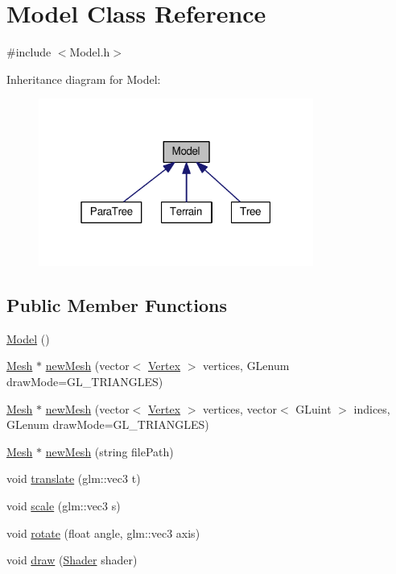 \hypertarget{class_model}{}\section{Model Class Reference}
\label{class_model}


{\ttfamily \#include $<$Model.\+h$>$}



Inheritance diagram for Model\+:\nopagebreak
\begin{figure}[H]
\begin{center}
\leavevmode
\includegraphics[width=256pt]{class_model__inherit__graph}
\end{center}
\end{figure}
\subsection*{Public Member Functions}
\begin{DoxyCompactItemize}
\item 
\hyperlink{class_model_ae3b375de5f6df4faf74a95d64748e048}{Model} ()
\item 
\hyperlink{class_mesh}{Mesh} $\ast$ \hyperlink{class_model_a0389a9deaec401c6050eddecfebd4eff}{new\+Mesh} (vector$<$ \hyperlink{struct_vertex}{Vertex} $>$ vertices, G\+Lenum draw\+Mode=G\+L\+\_\+\+T\+R\+I\+A\+N\+G\+L\+ES)
\item 
\hyperlink{class_mesh}{Mesh} $\ast$ \hyperlink{class_model_a1616abd0e910e0e8a9e37fe23d143ed5}{new\+Mesh} (vector$<$ \hyperlink{struct_vertex}{Vertex} $>$ vertices, vector$<$ G\+Luint $>$ indices, G\+Lenum draw\+Mode=G\+L\+\_\+\+T\+R\+I\+A\+N\+G\+L\+ES)
\item 
\hyperlink{class_mesh}{Mesh} $\ast$ \hyperlink{class_model_a5a54b1ec74ea98423c205d3fee7c744f}{new\+Mesh} (string file\+Path)
\item 
void \hyperlink{class_model_a967023af0128ffc4bb8609332234daea}{translate} (glm\+::vec3 t)
\item 
void \hyperlink{class_model_ac1cc7957271031bba837ba93e7f581e2}{scale} (glm\+::vec3 s)
\item 
void \hyperlink{class_model_a427830f435c2eb86481808d09b9fbe2d}{rotate} (float angle, glm\+::vec3 axis)
\item 
void \hyperlink{class_model_a083354971a2e7e1f4ac3efac85362f85}{draw} (\hyperlink{class_shader}{Shader} shader)
\end{DoxyCompactItemize}
